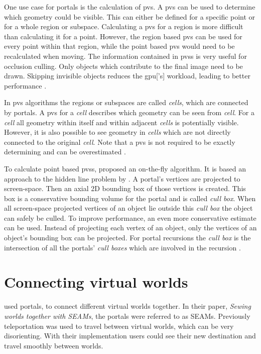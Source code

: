 One use case for portals is the calculation of \gls{pvs}. A \gls{pvs} can be used to determine which geometry could be visible. This can either be defined for a specific point or for a whole region or subspace. Calculating a \gls{pvs} for a region is more difficult than calculating it for a point. However, the region based \gls{pvs} can be used for every point within that region, while the point based \gls{pvs} would need to be recalculated when moving. The information contained in \glspl{pvs} is very useful for occlusion culling. Only objects which contribute to the final image need to be drawn. Skipping invisible objects reduces the \gls{gpu}['s] workload, leading to better performance \cite{cohen:2003:survey}.

In \gls{pvs} algorithms the regions or subspaces are called \textit{cells}, which are connected by portals. A \gls{pvs} for a \textit{cell} describes which geometry can be seen from \textit{cell}. For a \textit{cell} all geometry within itself and within adjacent \textit{cells} is potentially visible. However, it is also possible to see geometry in \textit{cells} which are not directly connected to the original \textit{cell}. Note that a \gls{pvs} is not required to be exactly determining and can be overestimated \cite{cohen:2003:survey}.

To calculate point based \glspl{pvs}, \textcite{luebke:1995:portals} proposed an on-the-fly algorithm. It is based an approach to the hidden line problem by \textcite{jones:1971:new}. A portal's vertices are projected to screen-space. Then an axial 2D bounding box of those vertices is created. This box is a conservative bounding volume for the portal and is called \textit{cull box}. When all screen-space projected vertices of an object lie outside this \textit{cull box} the object can safely be culled. To improve performance, an even more conservative estimate can be used. Instead of projecting each vertex of an object, only the vertices of an object's bounding box can be projected. For portal recursions the \textit{cull box} is the intersection of all the portals' \textit{cull boxes} which are involved in the recursion \cite{luebke:1995:portals}. 



\section{Connecting virtual worlds}

\textcite{schmalstieg:1999:sewing} used portals, to connect different virtual worlds together. In their paper, \textit{Sewing worlds together with SEAMs}, the portals were referred to as SEAMs. Previously teleportation was used to travel between virtual worlds, which can be very disorienting. With their implementation users could see their new destination and travel smoothly between worlds.


